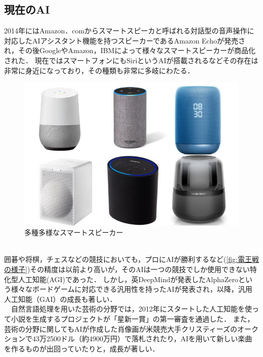 \subsection{現在のAI}
2014年にはAmazon．comからスマートスピーカと呼ばれる対話型の音声操作に対応したAIアシスタント機能を持つスピーカーであるAmazon Echoが発売され，その後GoogleやAmazon，IBMによって様々なスマートスピーカーが商品化された．
現在ではスマートフォンにもSiriというAIが搭載されるなどその存在は非常に身近になっており，その種類も非常に多岐にわたる．
\begin{figure}[!ht]
    \begin{screen}
    \begin{center}
        \includegraphics[scale=0.6,clip]{./img/smartspeaker_list.jpg}
        \caption{多種多様なスマートスピーカー}
        \label{fig:多種多様なスマートスピーカー}
    \end{center}
\end{screen}
\end{figure}\\
囲碁や将棋，チェスなどの競技においても，プロにAIが勝利するなど(\ref{fig:電王戦の様子})その精度は以前より高いが，そのAIは一つの競技でしか使用できない特化型人工知能(AGI)であった．
しかし，英DeepMindが発表したAlphaZeroという様々なボードゲームに対応できる汎用性を持ったAIが発表され，以降，汎用人工知能（GAI）の成長も著しい．\\
　自然言語処理を用いた芸術の分野では，2012年にスタートした人工知能を使って小説を生成するプロジェクトが「星新一賞」の第一審査を通過した．\cite{webpage2}
また，芸術の分野に関してもAIが作成した肖像画が米競売大手クリスティーズのオークションで43万2500ドル（約4900万円）で落札されたり，AIを用いて新しい楽曲を作るものが出回っていたりと，成長が著しい．\cite{webpage3}\\

